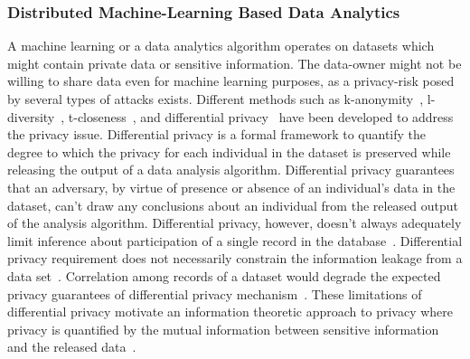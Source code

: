 \documentclass[a4paper,11pt]{article}
\begin{document}
\subsubsection{Distributed Machine-Learning Based Data Analytics}
\label{sect:background-first}
\label{sect:distAnalytics}
A machine learning or a data analytics algorithm operates on datasets which might contain private data or sensitive information. The data-owner might not be willing to share data even for machine learning purposes, as a privacy-risk posed by several types of attacks exists. Different methods such as k-anonymity~\cite{10.1142/S0218488502001648}, l-diversity~\cite{10.1145/1217299.1217302}, t-closeness~\cite{DBLP:conf/icde/LiLV07}, and differential privacy~\cite{10.1561/0400000042} have been developed to address the privacy issue. Differential privacy is a formal framework to quantify the degree to which the privacy for each individual in the dataset is preserved while releasing the output of a data analysis algorithm. Differential privacy guarantees that an adversary, by virtue of presence or absence of an individual's data in the dataset, can't draw any conclusions about an individual from the released output of the analysis algorithm. Differential privacy, however, doesn’t always adequately limit inference about participation of a single record in the database~\cite{10.1145/1989323.1989345}. Differential privacy requirement does not necessarily constrain the information leakage from a data set~\cite{Calmon_privacyagainst}. Correlation among records of a dataset would degrade the expected privacy guarantees of differential privacy mechanism~\cite{DBLP:conf/ndss/LiuMC16}. These limitations of differential privacy motivate an information theoretic approach to privacy where privacy is quantified by the mutual information between sensitive information and the released data~\cite{5288525,Calmon_privacyagainst,6482222,7888175,DBLP:journals/corr/abs-1710-09295}. 
\end{document}
